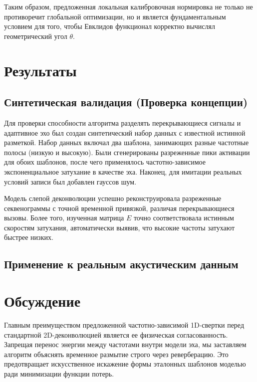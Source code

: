 \documentclass[11pt,a4paper]{article}
\begin{document}
Таким образом, предложенная локальная калибровочная нормировка не только не противоречит глобальной оптимизации, но и является фундаментальным условием для того, чтобы Евклидов функционал корректно вычислял геометрический угол $\theta$.

\section{Результаты}

\subsection{Синтетическая валидация (Проверка концепции)}
Для проверки способности алгоритма разделять перекрывающиеся сигналы и адаптивное эхо был создан синтетический набор данных с известной истинной разметкой. Набор данных включал два шаблона, занимающих разные частотные полосы (низкую и высокую). Были сгенерированы разреженные пики активации для обоих шаблонов, после чего применялось частотно-зависимое экспоненциальное затухание в качестве эха. Наконец, для имитации реальных условий записи был добавлен гауссов шум.

Модель слепой деконволюции успешно реконструировала разреженные секвенограммы с точной временной привязкой, различая перекрывающиеся вызовы. Более того, изученная матрица $E$ точно соответствовала истинным скоростям затухания, автоматически выявив, что высокие частоты затухают быстрее низких.


\subsection{Применение к реальным акустическим данным}

\section{Обсуждение}
Главным преимуществом предложенной частотно-зависимой 1D-свертки перед стандартной 2D-деконволюцией является ее физическая согласованность. Запрещая перенос энергии между частотами внутри модели эха, мы заставляем алгоритм объяснять временное размытие строго через реверберацию. Это предотвращает искусственное искажение формы эталонных шаблонов моделью ради минимизации функции потерь.
\end{document}
